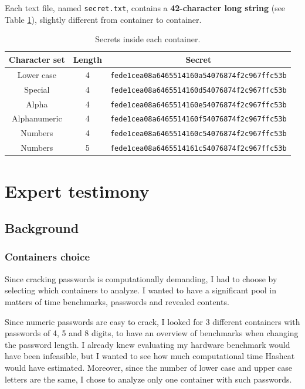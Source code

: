 \documentclass[12pt]{article}
\begin{document}
Each text file, named \texttt{secret.txt}, contains a \textbf{42-character long string} (see Table \ref{table:secret}), slightly different from container to container.

\begin{table}[!ht]
    \centering
    \begin{tabular}{ccc}
    \toprule
        \textbf{Character set} & \textbf{Length} & \textbf{Secret} \\ 
        \midrule
        Lower case & 4 & \texttt{fede1cea08a6465514160a54076874f2c967ffc53b} \\ 
        Special & 4 & \texttt{fede1cea08a6465514160d54076874f2c967ffc53b} \\ 
        Alpha & 4 & \texttt{fede1cea08a6465514160e54076874f2c967ffc53b} \\ 
        Alphanumeric & 4 & \texttt{fede1cea08a6465514160f54076874f2c967ffc53b} \\ 
        Numbers & 4 & \texttt{fede1cea08a6465514160c54076874f2c967ffc53b} \\ 
        Numbers & 5 & \texttt{fede1cea08a6465514161c54076874f2c967ffc53b} \\ 
    \bottomrule
    \end{tabular}
    \caption{Secrets inside each container.}
    \label{table:secret}
\end{table}

\section{Expert testimony}

\subsection{Background}

\subsubsection{Containers choice}
\label{sec:choice}

Since cracking passwords is computationally demanding, I had to choose by selecting which containers to analyze. I wanted to have a significant pool in matters of time benchmarks, passwords and revealed contents. 

Since numeric passwords are easy to crack, I looked for 3 different containers with passwords of 4, 5 and 8 digits, to have an overview of benchmarks when changing the password length. I already knew evaluating my hardware benchmark would have been infeasible, but I wanted to see how much computational time Hashcat would have estimated. Moreover, since the number of lower case and upper case letters are the same, I chose to analyze only one container with such passwords.
\end{document}
